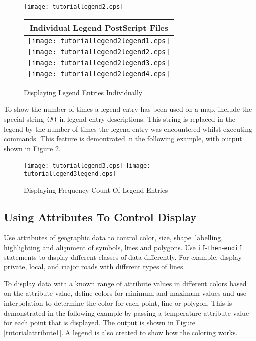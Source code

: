 

\begin{figure}[htb]
\texttt{[image: tutoriallegend2.eps]}

\begin{tabular}{|c|}
\hline
Individual Legend PostScript Files \\
\hline
\texttt{[image: tutoriallegend2legend1.eps]} \\
\hline
\texttt{[image: tutoriallegend2legend2.eps]} \\
\hline
\texttt{[image: tutoriallegend2legend3.eps]} \\
\hline
\texttt{[image: tutoriallegend2legend4.eps]} \\
\hline
\end{tabular}

\caption{Displaying Legend Entries Individually}
\label{tutoriallegend2}
\end{figure}

To show the number of times a legend entry has been used on
a map, include the special string \texttt{(\#)} in legend entry descriptions.
This string is replaced in the legend by the number of times the legend entry
was encountered whilst executing commands.
This feature is demontrated in the following example,
with output shown in 
Figure \ref{tutoriallegend3}.



\begin{figure}[htb]
\texttt{[image: tutoriallegend3.eps]}
\texttt{[image: tutoriallegend3legend.eps]}
\caption{Displaying Frequency Count Of Legend Entries}
\label{tutoriallegend3}
\end{figure}

\subsection{Using Attributes To Control Display}

Use attributes of geographic data to control
color, size, shape, labelling, highlighting and alignment of symbols, lines
and polygons.
Use \texttt{if}-\texttt{then}-\texttt{endif}
statements to display different classes of data
differently.  For example, display private, local, and major roads
with different types of lines.

To display data with a known range of attribute values in different
colors based on the attribute value, define colors for minimum and
maximum values and use interpolation to determine the color for
each point, line or polygon.  This is demonstrated in the following
example by passing a temperature attribute value for each point
that is displayed.  The output is shown in Figure \ref{tutorialattribute1}.
A legend is also created to show how the coloring works.

